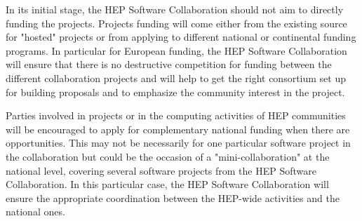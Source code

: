 \documentclass[11pt]{article} %
\begin{document}
In its initial stage, the HEP Software Collaboration should not aim to directly funding the projects. Projects funding will come
either from the existing source for "hosted" projects or from applying to different national or continental funding programs. In
particular for European funding, the HEP Software Collaboration will ensure that there is no destructive competition for funding
between the different collaboration projects and will help to get the right consortium set up for building proposals and to emphasize 
the community interest in the project.

Parties involved in projects or in the computing activities of HEP communities will be encouraged to apply for complementary national
funding when there are opportunities. This may not be necessarily for one particular software project in the collaboration but could be
the occasion of a "mini-collaboration" at the national level, covering several software projects from the HEP Software Collaboration. In this
particular case, the HEP Software Collaboration will ensure the appropriate coordination between the HEP-wide activities and the national ones.
\end{document}
